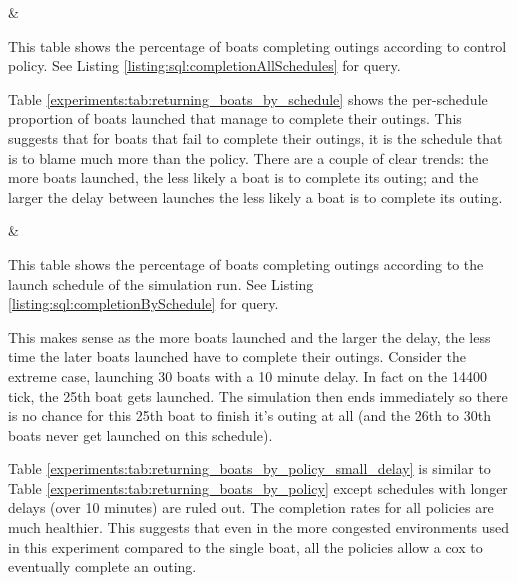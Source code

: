   \begin{table}[h]
  \centering
  {\cp & \landed}
  \caption{This table shows the percentage of boats completing outings according to control policy. See Listing \ref{listing:sql:completionAllSchedules} for query.}
  \label{experiments:tab:returning_boats_by_policy}
  \end{table}
  
  Table \ref{experiments:tab:returning_boats_by_schedule} shows the per-schedule proportion of boats launched that manage to complete their outings. This suggests that for boats that fail to complete their outings, it is the schedule that is to blame much more than the policy. There are a couple of clear trends: the more boats launched, the less likely a boat is to complete its outing; and the larger the delay between launches the less likely a boat is to complete its outing.

  \begin{table}[h]
  \centering
  {\name & \landed}
  \caption{This table shows the percentage of boats completing outings according to the launch schedule of the simulation run. See Listing \ref{listing:sql:completionBySchedule} for query.}
  \label{experiments:tab:returning_boats_by_schedule}
  \end{table}
  
  This makes sense as the more boats launched and the larger the delay, the less time the later boats launched have to complete their outings. Consider the extreme case, launching 30 boats with a 10 minute delay. In fact on the 14400 tick, the 25th boat gets launched. The simulation then ends immediately so there is no chance for this 25th boat to finish it's outing at all (and the 26th to 30th boats never get launched on this schedule). 
  
  Table \ref{experiments:tab:returning_boats_by_policy_small_delay} is similar to Table \ref{experiments:tab:returning_boats_by_policy} except schedules with longer delays (over 10 minutes) are ruled out. The completion rates for all policies are much healthier. This suggests that even in the more congested environments used in this experiment compared to the single boat, all the policies allow a cox to eventually complete an outing. 
  
